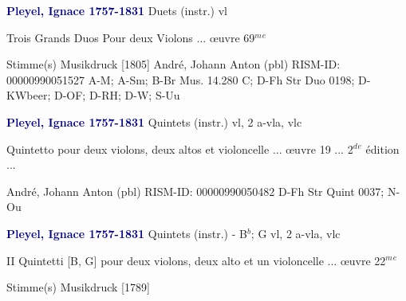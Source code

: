 \documentclass[twocolumn]{book}
\begin{document}
\newline \par \vspace{7pt} \textcolor{darkblue}{\textbf{Pleyel, Ignace  1757-1831}}
\newline Duets (instr.)
 vl
\newline \begin{itshape}Trois Grands Duos Pour deux Violons ... œuvre 69$^m$$^e$\end{itshape} 
\newline \textcolor{darkblue}{}  Stimme(s)
\newline Musikdruck  [1805]
\newline André, Johann Anton  (pbl)
\newline RISM-ID: 00000990051527
\newline A-M; A-Sm; B-Br  Mus. 14.280 C; D-Fh  Str Duo 0198; D-KWbeer; D-OF; D-RH; D-W; S-Uu
\newline \par \vspace{7pt} \textcolor{darkblue}{\textbf{Pleyel, Ignace  1757-1831}}
\newline Quintets (instr.)
 vl, 2 a-vla, vlc
\newline \begin{itshape}Quintetto pour deux violons, deux altos et violoncelle ... œuvre 19 ... 2$^d$$^e$ édition ...\end{itshape} 
\newline André, Johann Anton  (pbl)
\newline RISM-ID: 00000990050482
\newline D-Fh  Str Quint 0037; N-Ou
\newline \par \vspace{7pt} \textcolor{darkblue}{\textbf{Pleyel, Ignace  1757-1831}}
\newline Quintets (instr.) - B$^b$; G
 vl, 2 a-vla, vlc
\newline \begin{itshape}II Quintetti [B, G] pour deux violons, deux alto et un violoncelle ... œuvre 22$^m$$^e$\end{itshape} 
\newline \textcolor{darkblue}{}  Stimme(s)
\newline Musikdruck  [1789]
\end{document}
